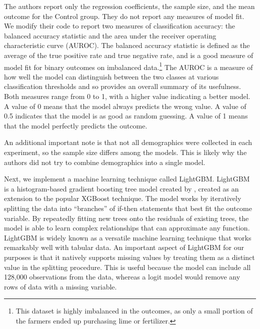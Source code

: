 \documentclass[12pt]{article}
\begin{document}
The authors report only the regression coefficients, the sample size, and the mean outcome for the Control group. They do not report any measures of model fit. We modify their code to report two measures of classification accuracy: the balanced accuracy statistic and the area under the receiver operating characteristic curve (AUROC). The balanced accuracy statistic is defined as the average of the true positive rate and true negative rate, and is a good measure of model fit for binary outcomes on imbalanced data.\footnote{This dataset is highly imbalanced in the outcomes, as only a small portion of the farmers ended up purchasing lime or fertilizer.} The AUROC is a measure of how well the model can distinguish between the two classes at various classification thresholds and so provides an overall summary of its usefulness. Both measures range from 0 to 1, with a higher value indicating a better model. A value of 0 means that the model always predicts the wrong value. A value of 0.5 indicates that the model is as good as random guessing. A value of 1 means that the model perfectly predicts the outcome.

An additional important note is that not all demographics were collected in each experiment, so the sample size differs among the models. This is likely why the authors did not try to combine demographics into a single model.

Next, we implement a machine learning technique called LightGBM. LightGBM is a histogram-based gradient boosting tree model created by \textcite{ke_lightgbm_2017}, created as an extension to the popular XGBoost technique. The model works by iteratively splitting the data into ``branches'' of if-then statements that best fit the outcome variable. By repeatedly fitting new trees onto the residuals of existing trees, the model is able to learn complex relationships that can approximate any function. LightGBM is widely known as a versatile machine learning technique that works remarkably well with tabular data. An important aspect of LightGBM for our purposes is that it natively supports missing values by treating them as a distinct value in the splitting procedure. This is useful because the model can include all 128,000 observations from the data, whereas a logit model would remove any rows of data with a missing variable.
\end{document}
